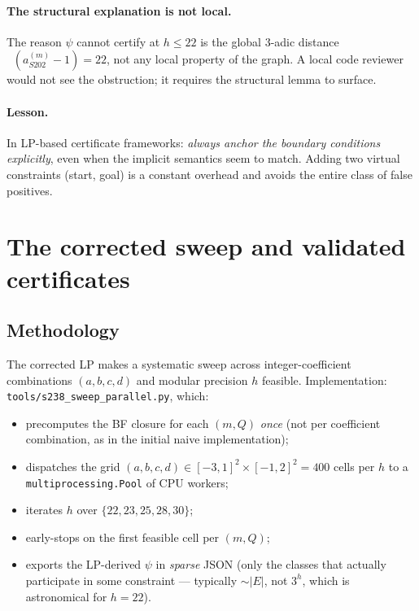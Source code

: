 \documentclass[11pt,a4paper]{article}
\theoremstyle{plain}
\theoremstyle{definition}
\newcommand{\aSat}{a_{S202}^{(m)}}
\DeclareMathOperator{\nuthree}{\nu_3}
\begin{document}
\paragraph{The structural explanation is not local.}
The reason $\psi$ cannot certify at $h \le 22$ is the global
3-adic distance $\nuthree(\aSat - 1) = 22$, not any local
property of the graph. A local code reviewer would not see the
obstruction; it requires the structural lemma to surface.

\paragraph{Lesson.}
In LP-based certificate frameworks: \emph{always anchor the boundary
conditions explicitly}, even when the implicit semantics seem to
match. Adding two virtual constraints (start, goal) is a constant
overhead and avoids the entire class of false positives.

\section{The corrected sweep and validated certificates}\label{sec:s238}

\subsection{Methodology}

The corrected LP makes a systematic sweep across integer-coefficient
combinations $(a, b, c, d)$ and modular precision $h$ feasible.
Implementation: \texttt{tools/s238\_sweep\_parallel.py}, which:
\begin{itemize}
  \item precomputes the BF closure for each $(m, Q)$ \emph{once}
        (not per coefficient combination, as in the initial naive
        implementation);
  \item dispatches the grid
        $(a, b, c, d) \in [-3, 1]^2 \times [-1, 2]^2 = 400$ cells
        per $h$ to a \texttt{multiprocessing.Pool} of CPU workers;
  \item iterates $h$ over $\{22, 23, 25, 28, 30\}$;
  \item early-stops on the first feasible cell per $(m, Q)$;
  \item exports the LP-derived $\psi$ in \emph{sparse} JSON
        (only the classes that actually participate in some
        constraint — typically $\sim |E|$, not $3^h$, which is
        astronomical for $h = 22$).
\end{itemize}
\end{document}
